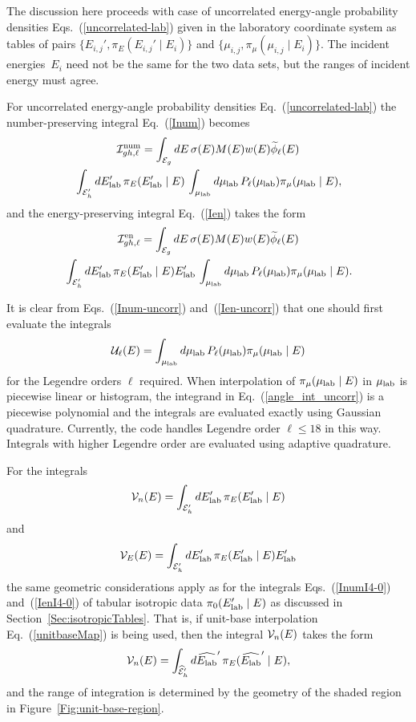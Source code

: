 The discussion here proceeds with case of uncorrelated energy-angle
probability densities Eqs.~(\ref{uncorrelated-lab}) given in the laboratory 
coordinate system as tables of pairs $\{E_{i,j}', \pi_E(E_{i,j}' \mid E_i)\}$
and $\{\mu_{i,j}, \pi_\mu(\mu_{i,j} \mid E_i)\}$.
The incident energies~$E_i$ need not be the same for the two data sets,
but the ranges of incident energy must agree.

For uncorrelated energy-angle probability densities
Eq.~(\ref{uncorrelated-lab}) the number-preserving integral Eq.~(\ref{Inum}) becomes
\begin{multline}
   {\cal I}^{\text{num}}_{gh,\ell} =
        \int_{{\cal E}_g} dE \, \sigma ( E ) M(E) w(E) \widetilde \phi_\ell(E) \\
       \, \int_{{\cal E}_h' } dE_{\text{lab}}'   \, \pi_E(E_{\text{lab}}'   \mid E)
       \, \int_{\mu_{\text{lab}}}   d\mu_{\text{lab}}   \,  P_\ell( \mu_{\text{lab}}   ) \pi_\mu(\mu_{\text{lab}}   \mid E),
  \label{Inum-uncorr}
\end{multline}
and the energy-preserving integral Eq.~(\ref{Ien}) takes the form
\begin{multline}
  {\cal I}^{\text{en}}_{gh,\ell} =
     \int_{{\cal E}_g} dE \, \sigma ( E ) M(E) w(E) \widetilde \phi_\ell(E) \\
     \, \int_{{\cal E}_h' } dE_{\text{lab}}'   \, \pi_E(E_{\text{lab}}'   \mid E) E_{\text{lab}}'  
     \, \int_{\mu_{\text{lab}}}   d\mu_{\text{lab}}    \,  P_\ell ( \mu_{\text{lab}}   ) \pi_\mu(\mu_{\text{lab}}   \mid E).
  \label{Ien-uncorr}
\end{multline}

It is clear from Eqs.~(\ref{Inum-uncorr}) and~(\ref{Ien-uncorr}) that
one should first evaluate the integrals
\begin{equation}
  {\cal U}_\ell( E ) =  \int_{\mu_{\text{lab}}}   d\mu_{\text{lab}}   \, P_\ell ( \mu_{\text{lab}}   ) \pi_\mu(\mu_{\text{lab}}   \mid E)
  \label{angle_int_uncorr}
\end{equation}
for the Legendre orders $\ell$ required.  When interpolation of  $\pi_\mu(\mu_{\text{lab}}   \mid E)$
in $\mu_{\text{lab}}$ is piecewise linear or histogram, the integrand in Eq.~(\ref{angle_int_uncorr})
is a piecewise polynomial and the integrals are evaluated exactly using Gaussian quadrature.
Currently, the code handles Legendre order $\ell \le 18$ in this way.  Integrals with higher
Legendre order are evaluated using adaptive quadrature.

For the integrals
$$
  {\cal V}_n( E ) = \int_{{\cal E}_h' } dE_{\text{lab}}'   \, \pi_E(E_{\text{lab}}'   \mid E)
$$
and
$$
  {\cal V}_E( E ) = \int_{{\cal E}_h' } dE_{\text{lab}}'   \, \pi_E  (E_{\text{lab}}'   \mid E) E_{\text{lab}}'  
$$
the same geometric considerations apply as for the integrals Eqs.~(\ref{InumI4-0}) 
and~(\ref{IenI4-0}) of tabular isotropic data $\pi_0(E_{\text{lab}}'   \mid E)$
as discussed in Section~\ref{Sec:isotropicTables}.  That is, if unit-base interpolation
Eq.~(\ref{unitbaseMap}) is being used, then the integral ${\cal V}_n( E )$ takes the form
$$
  {\cal V}_n( E ) = \int_{\widehat{{\cal E}}_h' } d\widehat {E_{\text{lab}}}'   \, \pi_E(\widehat {E_{\text{lab}}}'   \mid E),
$$
and the range of integration is determined by the geometry of the
shaded region in Figure~\ref{Fig:unit-base-region}.

